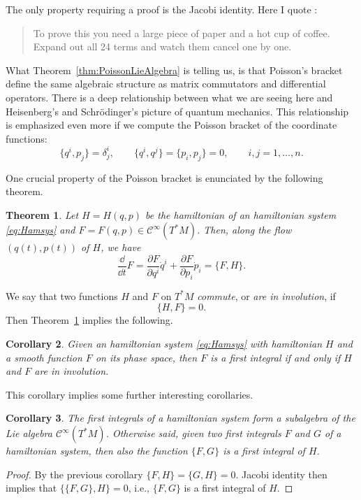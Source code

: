 \documentclass[english,fontsize=11pt,paper=b5]{scrbook}
\newtheorem{theorem}{Theorem}[chapter]
\newtheorem{corollary}[theorem]{Corollary}
\theoremstyle{definition}
\begin{document}
    The only property requiring a proof is the Jacobi identity.
    Here I quote \cite{lectures:tong}:
    \begin{quote}
      To prove this you need a large piece of paper and a hot cup of coffee. Expand out all 24 terms and watch them cancel one by one.
    \end{quote}

    What Theorem~\ref{thm:PoissonLieAlgebra} is telling us, is that Poisson's bracket define the same algebraic structure as matrix commutators and differential operators.
    There is a deep relationship between what we are seeing here and Heisenberg's and Schr\"odinger's picture of quantum mechanics.
    This relationship is emphasized even more if we compute the Poisson bracket of the coordinate functions:
    \begin{equation}\label{eq:coordcommutators}
      \big\{q^i,p_j\big\} = \delta^i_j, \qquad \big\{q^i,q^j\big\} = \big\{p_i,p_j\big\} = 0, \qquad i,j = 1,\ldots,n.
    \end{equation}

    One crucial property of the Poisson bracket is enunciated by the following theorem.

    \begin{theorem}\label{thm:poissondtdF}
      Let $H=H(q,p)$ be the hamiltonian of an hamiltonian system \eqref{eq:Hamsys} and $F=F(q,p)\in\mathcal{C}^\infty(T^*M)$.
      Then, along the flow $(q(t), p(t))$ of $H$, we have
      \begin{equation}
        \frac{\dd}{\dd t} F = \frac{\partial F}{\partial q^i} \dot q^i + \frac{\partial F}{\partial p_i} \dot p_i = \big\{F,H\big\}.
      \end{equation}
    \end{theorem}

    We say that two functions $H$ and $F$ on $T^* M$ \emph{commute}, or \emph{are in involution}, if
    \begin{equation}
      \big\{H,F\big\} = 0.
    \end{equation}
    Then Theorem~\ref{thm:poissondtdF} implies the following.
    \begin{corollary}
      Given an hamiltonian system \eqref{eq:Hamsys} with hamiltonian $H$ and a smooth function $F$ on its phase space, then $F$ is a first integral if and only if $H$ and $F$ are in involution.
    \end{corollary}

    This corollary implies some further interesting corollaries.
    \begin{corollary}
      The first integrals of a hamiltonian system form a subalgebra of the Lie algebra $\mathcal{C}^\infty(T^*M)$.
      Otherwise said, given two first integrals $F$ and $G$ of a hamiltonian system, then also the function $\big\{F,G\big\}$ is a first integral of $H$.
    \end{corollary}
    \begin{proof}
      By the previous corollary $\big\{F,H\big\} = \big\{G,H\big\} = 0$.
      Jacobi identity then implies that $\big\{\big\{F,G\big\},H\big\} = 0$, i.e., $\big\{F,G\big\}$ is a first integral of $H$.
    \end{proof}
\end{document}
